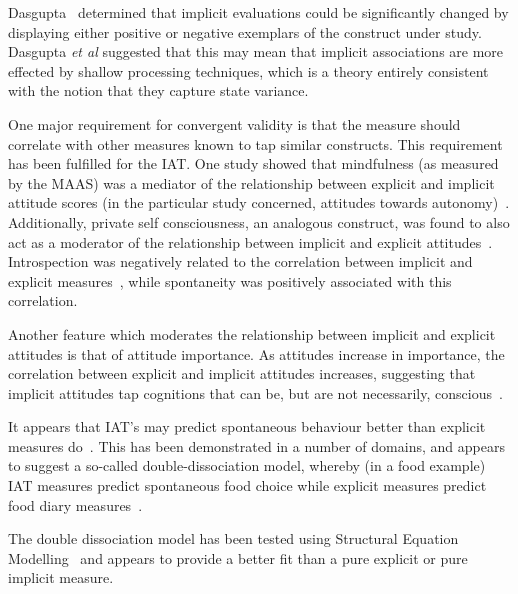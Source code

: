 Dasgupta~\cite{Dasgupta2001} determined that implicit evaluations could be significantly changed by displaying either positive or negative exemplars of the construct under study. Dasgupta \textit{et al} suggested that this may mean that implicit associations are more effected by shallow processing techniques, which is a theory entirely consistent with the notion that they capture state variance. 

One major requirement for convergent validity is that the measure should correlate with other measures known to tap similar constructs. This requirement has been fulfilled for the IAT. One study showed that mindfulness (as measured by the MAAS) was a mediator of the relationship between explicit and implicit attitude scores (in the particular study concerned, attitudes towards autonomy)~\cite{Levesque2007}. Additionally, private self consciousness, an analogous construct, was found to also act as a moderator of the relationship between implicit and explicit attitudes~\cite{Gschwendner2006}. Introspection was negatively related to the correlation between implicit and explicit measures~\cite{Hofmann2005}, while spontaneity was positively associated with this correlation. 

Another feature which moderates the relationship between implicit and explicit attitudes is that of attitude importance. As attitudes increase in importance, the correlation between explicit and implicit attitudes increases, suggesting that implicit attitudes tap cognitions that can be, but are not necessarily, conscious~\cite{Karpinski2005}. 


It appears that IAT's may predict spontaneous behaviour better than explicit measures do~\cite{Asendorpf2002,Richetin2007,Perugini2005}. This has been demonstrated in a number of domains, and appears to suggest a so-called double-dissociation model, whereby (in a food example) IAT measures predict spontaneous food choice while explicit measures predict food diary measures~\cite{Richetin2007}. 

The double dissociation model has been tested using Structural Equation Modelling~\cite{Nosek2007a,Perugini2005} and appears to provide a better fit than a pure explicit or pure implicit measure. %

